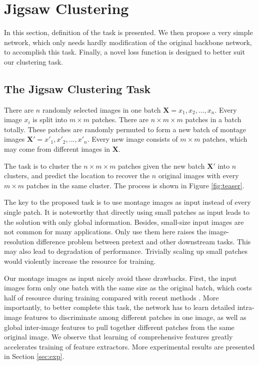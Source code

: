 \documentclass[final]{cvpr}
\begin{document}
\section{Jigsaw Clustering}
In this section, definition of the task is presented. We then propose a very simple network, which only needs hardly modification of the original backbone network, to accomplish this task. Finally, a novel loss function is designed to better suit our clustering task.
 
\subsection{The Jigsaw Clustering Task}
There are $n$ randomly selected images in one batch $\mathbf{X} = {x_1, x_2, ... , x_n}$. Every image $x_i$ is split into $m \times m$ patches. There are $n\times m \times m$ patches in a batch totally. These patches are randomly permuted to form a new batch of montage images $\mathbf{X}' = {x'_1, x'_2, ..., x'_n}$. Every new image consists of $m\times m$ patches, which may come from different images in $\mathbf{X}$.
 
The task is to cluster the $n\times m \times m$ patches given the new batch $\mathbf{X}'$ into $n$ clusters, and predict the location to recover the $n$ original images with every $m\times m$ patches in the same cluster. The process is shown in Figure \ref{fig:teaser}.

The key to the proposed task is to use montage images as input instead of every single patch. It is noteworthy that directly using small patches as input leads to the solution with only global information. Besides, small-size input images are not common for many applications. Only use them here raises the image-resolution difference problem between pretext and other downstream tasks. This may also lead to degradation of performance. Trivially scaling up small patches would violently increase the resource for training. 

Our montage images as input nicely avoid these drawbacks. First, the input images form only one batch with the same size as the original batch, which costs half of resource during training compared with recent methods \cite{simclr,moco}. More importantly, to better complete this task, the network has to learn detailed intra-image features to discriminate among different patches in one image, as well as global inter-image features to pull together different patches from the same original image. We observe that learning of comprehensive features greatly accelerates training of feature extractors. More experimental results are presented in Section \ref{sec:exp}.
\end{document}
